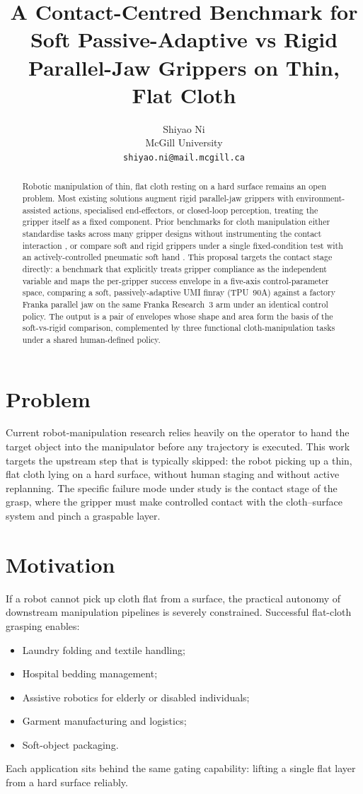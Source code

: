 \documentclass[10pt,letterpaper]{article}
\title{A Contact-Centred Benchmark for Soft Passive-Adaptive vs Rigid
       Parallel-Jaw Grippers on Thin, Flat Cloth}
\author{Shiyao Ni \\
        McGill University \\
        \texttt{shiyao.ni@mail.mcgill.ca}}
\date{}
\begin{document}
\maketitle

\begin{abstract}
Robotic manipulation of thin, flat cloth resting on a hard surface remains
an open problem. Most existing solutions augment rigid parallel-jaw
grippers with environment-assisted actions, specialised end-effectors, or
closed-loop perception, treating the gripper itself as a fixed component.
Prior benchmarks for cloth manipulation either standardise tasks across
many gripper designs without instrumenting the contact interaction
\cite{Clark2023}, or compare soft and rigid grippers under a single
fixed-condition test with an actively-controlled pneumatic soft hand
\cite{Teeple2022}. This proposal targets the contact stage directly:
a benchmark that explicitly treats gripper compliance as the independent
variable and maps the per-gripper success envelope in a five-axis
control-parameter space, comparing a soft, passively-adaptive UMI
finray (TPU~90A) against a factory Franka parallel jaw on the same
Franka Research~3 arm under an identical control policy. The output is
a pair of envelopes whose shape and area form the basis of the soft-vs-rigid
comparison, complemented by three functional cloth-manipulation tasks
under a shared human-defined policy.
\end{abstract}

\section{Problem}
\label{sec:problem}
Current robot-manipulation research relies heavily on the operator to hand
the target object into the manipulator before any trajectory is executed.
This work targets the upstream step that is typically skipped: the robot
picking up a thin, flat cloth lying on a hard surface, without
human staging and without active replanning. The specific failure mode
under study is the contact stage of the grasp, where the gripper must
make controlled contact with the cloth--surface system and pinch a
graspable layer.

\section{Motivation}
\label{sec:motivation}
If a robot cannot pick up cloth flat from a surface, the practical
autonomy of downstream manipulation pipelines is severely constrained.
Successful flat-cloth grasping enables:
\begin{itemize}[leftmargin=*,nosep]
    \item Laundry folding and textile handling;
    \item Hospital bedding management;
    \item Assistive robotics for elderly or disabled individuals;
    \item Garment manufacturing and logistics;
    \item Soft-object packaging.
\end{itemize}
Each application sits behind the same gating capability: lifting a
single flat layer from a hard surface reliably.
\end{document}
